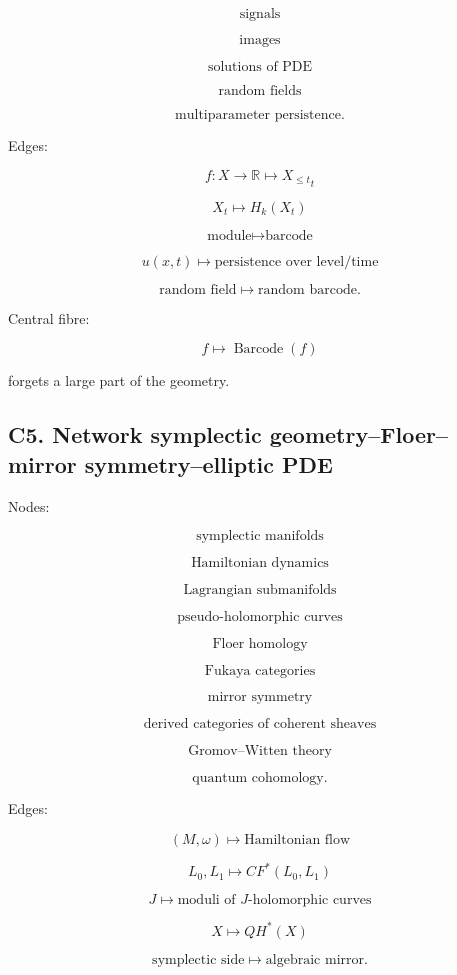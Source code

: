 \documentclass[11pt]{article}
\begin{document}
\[
\text{signals}
\]

\[
\text{images}
\]

\[
\text{solutions of PDE}
\]

\[
\text{random fields}
\]

\[
\text{multiparameter persistence}.
\]

Edges:

\[
f:X\to\mathbb R\mapsto {X_{\le t}}_t
\]

\[
{X_t}\mapsto H_k(X_t)
\]

\[
\text{module}\mapsto \text{barcode}
\]

\[
u(x,t)\mapsto \text{persistence over level/time}
\]

\[
\text{random field}\mapsto \text{random barcode}.
\]

Central fibre:

\[
f\mapsto \operatorname{Barcode}(f)
\]

forgets a large part of the geometry.



\subsection{C5. Network symplectic geometry--Floer--mirror symmetry--elliptic PDE}

Nodes:

\[
\text{symplectic manifolds}
\]

\[
\text{Hamiltonian dynamics}
\]

\[
\text{Lagrangian submanifolds}
\]

\[
\text{pseudo-holomorphic curves}
\]

\[
\text{Floer homology}
\]

\[
\text{Fukaya categories}
\]

\[
\text{mirror symmetry}
\]

\[
\text{derived categories of coherent sheaves}
\]

\[
\text{Gromov--Witten theory}
\]

\[
\text{quantum cohomology}.
\]

Edges:

\[
(M,\omega)\mapsto \text{Hamiltonian flow}
\]

\[
L_0,L_1\mapsto CF^\ast(L_0,L_1)
\]

\[
J\mapsto \text{moduli of }J\text{-holomorphic curves}
\]

\[
X\mapsto QH^\ast(X)
\]

\[
\text{symplectic side}\mapsto \text{algebraic mirror}.
\]
\end{document}
